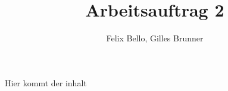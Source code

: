 \documentclass{article}
\author{Felix Bello, Gilles Brunner}
\title{Arbeitsauftrag 2}
\begin{document}
	\maketitle
	Hier kommt der inhalt
\end{document}

